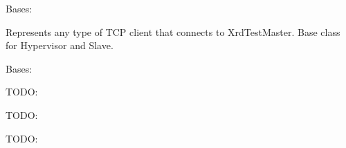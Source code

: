 \documentclass[letterpaper,10pt,english]{sphinxmanual}
\begin{document}
\begin{fulllineitems}
\label{ref-manual/XrdTest:XrdTest.TCPClient.TCPClient}
Bases: {\hyperref[ref-manual/XrdTest:XrdTest.Utils.Stateful]{}}

Represents any type of TCP client that connects to XrdTestMaster. Base
class for Hypervisor and Slave.

\begin{fulllineitems}
\label{ref-manual/XrdTest:XrdTest.TCPClient.TCPClient.S_CONNECTED_IDLE}
\end{fulllineitems}


\begin{fulllineitems}
\label{ref-manual/XrdTest:XrdTest.TCPClient.TCPClient.S_NOT_CONNECTED}
\end{fulllineitems}


\begin{fulllineitems}
\label{ref-manual/XrdTest:XrdTest.TCPClient.TCPClient.send}
\end{fulllineitems}


\end{fulllineitems}


\begin{fulllineitems}
\label{ref-manual/XrdTest:XrdTest.TCPClient.TCPReceiveThread}
Bases: 

TODO:

\begin{fulllineitems}
\label{ref-manual/XrdTest:XrdTest.TCPClient.TCPReceiveThread.close}
TODO:

\end{fulllineitems}


\begin{fulllineitems}
\label{ref-manual/XrdTest:XrdTest.TCPClient.TCPReceiveThread.run}
TODO:

\end{fulllineitems}


\end{fulllineitems}
\end{document}
